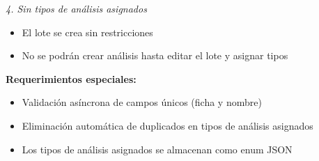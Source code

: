 \vspace{0.3em}
\noindent\textit{4. Sin tipos de análisis asignados}
\begin{itemize}[nosep]
    \item El lote se crea sin restricciones
    \item No se podrán crear análisis hasta editar el lote y asignar tipos
\end{itemize}

\vspace{0.5em}
\noindent\textbf{Requerimientos especiales:}
\begin{itemize}[nosep]
    \item Validación asíncrona de campos únicos (ficha y nombre)
    \item Eliminación automática de duplicados en tipos de análisis asignados
    \item Los tipos de análisis asignados se almacenan como enum JSON
\end{itemize}
